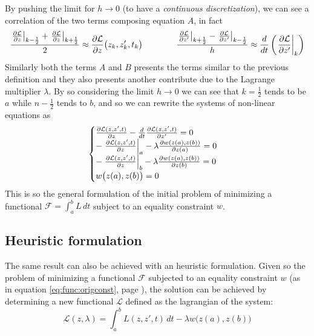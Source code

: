 By pushing the limit for $h\rightarrow 0$ (to have a \textit{continuous discretization}), we can see a correlation of the two terms composing equation $A$, in fact
\[	\dfrac{\left. \frac{\partial \mathcal L  }{\partial z} \right|_{k - \frac 1 2} + \left. \frac{\partial \mathcal L  }{\partial z} \right|_{k + \frac 1 2}}{2} \approx \frac{\partial \mathcal L  }{\partial z} \big(z_k,z_k',t_k\big) \qquad \qquad  \dfrac{\left. \frac{\partial \mathcal L  }{\partial z'} \right|_{k + \frac 1 2} - \left. \frac{\partial \mathcal L  }{\partial z'} \right|_{k - \frac 1 2}}{h} \approx \frac d{dt} \left( \left. \frac{\partial \mathcal L  }{\partial z'} \right|_k \right)  \]
Similarly both the terms $A$ and $B$ presents the terms similar to the previous definition and they also presents another contribute due to the Lagrange multiplier $\lambda$. By so considering the limit $h\rightarrow 0$ we can see that $k=\frac 1 2$ tends to be $a$ while $n-\frac 1 2$ tends to $b$, and so we can rewrite the systems of non-linear equations as
\[ \begin{cases}
	\frac{\partial \mathcal L   (z,z',t)}{\partial z} - \frac d{dt} \frac{\partial \mathcal L  (z,z',t)}{\partial z'} = 0 \\
	-\left.\frac{\partial \mathcal L  (z,z',t)}{\partial z}\right|_a - \lambda \frac{\partial w(z(a),z(b))}{\partial z(a)} = 0 \\
	-\left.\frac{\partial \mathcal L  (z,z',t)}{\partial z}\right|_b - \lambda \frac{\partial w(z(a),z(b))}{\partial z(b)} = 0 \\
	w\big(z(a),z(b)\big) = 0
\end{cases} \]
This is so the general formulation of the initial problem of minimizing a functional $\mathcal F = \int_a^b L \, dt$  subject to an equality constraint $w$. 

\subsection*{Heuristic formulation} 
The same result can also be achieved with an heuristic formulation. Given so the problem of minimizing a functional $\mathcal F$ subjected to an equality constraint $w$ (as in equation \ref{eq:func:origconst}, page \pageref{eq:func:origconst}), the solution can be achieved by determining a new functional $\mathcal L  $ defined as the lagrangian of the system:
\begin{equation}
	\mathcal L  (z,\lambda) = \int_a^b L (z,z',t)\, dt - \lambda w\big(z(a),z(b)\big)
\end{equation}

